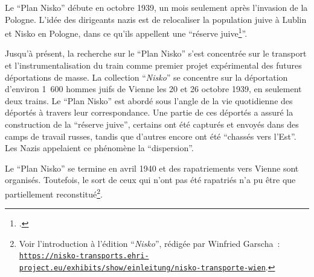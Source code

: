 Le \enquote{Plan Nisko} débute en octobre 1939, un mois seulement après l'invasion de la Pologne. L'idée des dirigeants nazis est de relocaliser la population juive à Lublin et Nisko en Pologne, dans ce qu'ils appellent une \enquote{réserve juive\footcite[p.~34]{Bensoussan2020}}.  

Jusqu'à présent, la recherche sur le \enquote{Plan Nisko} s'est concentrée sur le transport et l'instrumentalisation du train comme premier projet expérimental des futures déportations de masse. La collection \enquote{\textit{Nisko}} se concentre sur la déportation d'environ 1~600 hommes juifs de Vienne les 20 et 26 octobre 1939, en seulement deux trains. Le \enquote{Plan Nisko} est abordé sous l'angle de la vie quotidienne des déportés à travers leur correspondance. Une partie de ces déportés a assuré la construction de la \enquote{réserve juive}, certains ont été capturés et envoyés dans des camps de travail russes, tandis que d'autres encore ont été \enquote{chassés vers l'Est}. Les Nazis appelaient ce phénomène la \enquote{dispersion}.  

Le \enquote{Plan Nisko} se termine en avril 1940 et des rapatriements vers Vienne sont organisés. Toutefois, le sort de ceux qui n'ont pas été rapatriés n'a pu être que partiellement reconstitué\footnote{Voir l'introduction à l'édition \enquote{\textit{Nisko}}, rédigée par Winfried Garscha~: \texttt{\href{https://nisko-transports.ehri-project.eu/exhibits/show/einleitung/nisko-transporte-wien}{https://nisko-transports.ehri-project.eu/exhibits/show/einleitung/nisko-transporte-wien}}.}.  